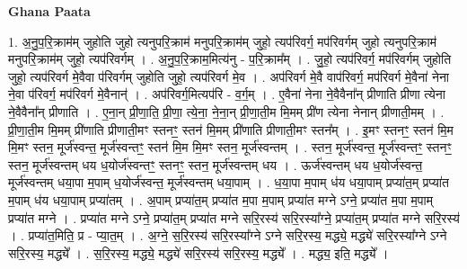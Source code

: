 \documentclass[17pt]{extarticle}
\begin{document}
\textbf{Ghana Paata } \newline

1. अ॒नु॒प॒रि॒क्राम॑म् जुहोति जुहो त्यनुपरि॒क्राम॑ मनुपरि॒क्राम॑म् जुहो॒ त्यप॑रिवर्ग॒ मप॑रिवर्गम् जुहो
त्यनुपरि॒क्राम॑ मनुपरि॒क्राम॑म् जुहो॒ त्यप॑रिवर्गम् । . अ॒नु॒प॒रि॒क्राम॒मित्य॑नु - प॒रि॒क्राम᳚म् । . जु॒हो॒ त्यप॑रिवर्ग॒ मप॑रिवर्गम् जुहोति जुहो॒ त्यप॑रिवर्ग मे॒वैवा प॑रिवर्गम् जुहोति जुहो॒ त्यप॑रिवर्ग मे॒व । . अप॑रिवर्ग मे॒वै वाप॑रिवर्ग॒ मप॑रिवर्ग मे॒वैना॑ नेना ने॒वा प॑रिवर्ग॒ मप॑रिवर्ग मे॒वैनान्॑ । . अप॑रिवर्ग॒मित्यप॑रि - व॒र्ग॒म् । . ए॒वैना॑ नेना ने॒वैवैना᳚न् प्रीणाति प्रीणा त्येना ने॒वैवैना᳚न् प्रीणाति । . ए॒ना॒न् प्री॒णा॒ति॒ प्री॒णा॒ त्ये॒ना॒ ने॒ना॒न् प्री॒णा॒ती॒म मि॒मम् प्री॑ण त्येना नेनान् प्रीणाती॒मम् । . प्री॒णा॒ती॒म मि॒मम् प्री॑णाति प्रीणाती॒मꣳ स्तनꣳ॒॒ स्तन॑ मि॒मम् प्री॑णाति प्रीणाती॒मꣳ स्तन᳚म् । . इ॒मꣳ स्तनꣳ॒॒ स्तन॑ मि॒म मि॒मꣳ स्तन॒ मूर्ज॑स्वन्त॒ मूर्ज॑स्वन्तꣳ॒॒ स्तन॑ मि॒म मि॒मꣳ स्तन॒ मूर्ज॑स्वन्तम् । . स्तन॒ मूर्ज॑स्वन्त॒ मूर्ज॑स्वन्तꣳ॒॒ स्तनꣳ॒॒ स्तन॒ मूर्ज॑स्वन्तम् धय ध॒योर्ज॑स्वन्तꣳ॒॒ स्तनꣳ॒॒ स्तन॒ मूर्ज॑स्वन्तम् धय । . ऊर्ज॑स्वन्तम् धय ध॒योर्ज॑स्वन्त॒ मूर्ज॑स्वन्तम् धया॒पा म॒पाम् ध॒योर्ज॑स्वन्त॒ मूर्ज॑स्वन्तम् धया॒पाम् । . ध॒या॒पा म॒पाम् ध॑य धया॒पाम् प्रप्या॑त॒म् प्रप्या॑त म॒पाम् ध॑य धया॒पाम् प्रप्या॑तम् । . अ॒पाम् प्रप्या॑त॒म् प्रप्या॑त म॒पा म॒पाम् प्रप्या॑त मग्ने ऽग्ने॒ प्रप्या॑त म॒पा म॒पाम् प्रप्या॑त मग्ने । . प्रप्या॑त मग्ने ऽग्ने॒ प्रप्या॑त॒म् प्रप्या॑त मग्ने सरि॒रस्य॑ सरि॒रस्या᳚ग्ने॒ प्रप्या॑त॒म् प्रप्या॑त मग्ने सरि॒रस्य॑ । . प्रप्या॑त॒मिति॒ प्र - प्या॒त॒म् । . अ॒ग्ने॒ स॒रि॒रस्य॑ सरि॒रस्या᳚ग्ने ऽग्ने सरि॒रस्य॒ मद्ध्ये॒ मद्ध्ये॑ सरि॒रस्या᳚ग्ने ऽग्ने सरि॒रस्य॒ मद्ध्ये᳚ । . स॒रि॒रस्य॒ मद्ध्ये॒ मद्ध्ये॑ सरि॒रस्य॑ सरि॒रस्य॒ मद्ध्ये᳚ । . मद्ध्य॒ इति॒ मद्ध्ये᳚ । \newline
\end{document}

